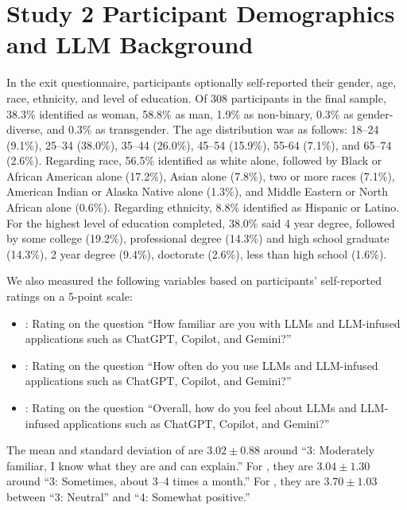 \section{Study 2 Participant Demographics and LLM Background}
\label{app:study2participants}

In the exit questionnaire, participants optionally self-reported their gender, age, race, ethnicity, and level of education.
Of 308 participants in the final sample, 38.3\% identified as woman, 58.8\% as man, 1.9\% as non-binary, 0.3\% as gender-diverse, and 0.3\% as transgender.
The age distribution was as follows: 18--24 (9.1\%), 25--34 (38.0\%), 35--44 (26.0\%), 45--54 (15.9\%), 55-64 (7.1\%), and 65--74 (2.6\%).
Regarding race, 56.5\% identified as white alone, followed by Black or African American alone (17.2\%), Asian alone (7.8\%), two or more races (7.1\%), American Indian or Alaska Native alone (1.3\%), and Middle Eastern or North African alone (0.6\%).
Regarding ethnicity, 8.8\% identified as Hispanic or Latino.
For the highest level of education completed, 38.0\% said 4 year degree, followed by some college (19.2\%), professional degree (14.3\%) and high school graduate (14.3\%), 2 year degree (9.4\%), doctorate (2.6\%), less than high school (1.6\%).


We also measured the following variables based on participants' self-reported ratings on a 5-point scale:
\begin{itemize}%
    \item {}: Rating on the question ``How familiar are you with LLMs and LLM-infused applications such as ChatGPT, Copilot, and Gemini?'' 
    \item {}: Rating on the question ``How often do you use LLMs and LLM-infused applications such as ChatGPT, Copilot, and Gemini?''
    \item {}: Rating on the question ``Overall, how do you feel about LLMs and LLM-infused applications such as ChatGPT, Copilot, and Gemini?'' 
\end{itemize}

The mean and standard deviation of  are $3.02 \pm 0.88$ around ``3: Moderately familiar, I know what they are and can explain.''
For , they are $3.04 \pm 1.30$ around ``3: Sometimes, about 3--4 times a month.''
For , they are $3.70 \pm 1.03 $ between ``3: Neutral'' and ``4: Somewhat positive.''



